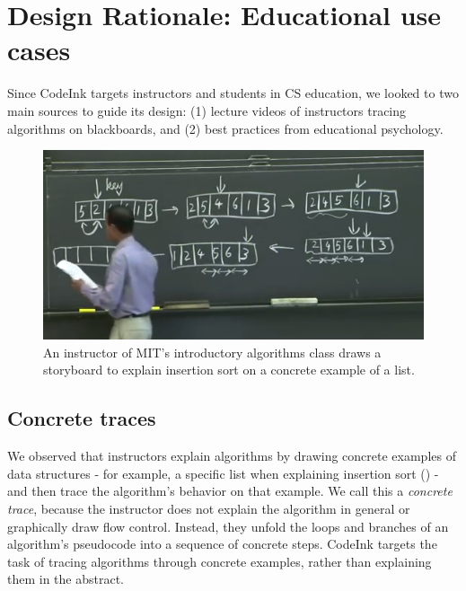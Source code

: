 \section{Design Rationale: Educational use cases}

Since CodeInk targets instructors and students in CS education, we looked to two
main sources to guide its design: (1) lecture videos of instructors tracing
algorithms on blackboards, and (2) best practices from educational psychology.

\begin{figure}
\begin{center}
\includegraphics[width=0.7\columnwidth]{img/6006/insertion.png}
\end{center}
\caption{An instructor of MIT's introductory algorithms class draws a storyboard
to explain insertion sort on a concrete example of a list.}
\label{fig:6006-insertion}
\end{figure}


\subsection{Concrete traces}
We observed that instructors explain algorithms by drawing concrete examples of
data structures - for example, a specific list when explaining insertion sort
() - and then trace the algorithm's behavior on that
example. We call this a \emph{concrete trace}, because the instructor does not
explain the algorithm in general or graphically draw flow control. Instead, they
unfold the loops and branches of an algorithm's pseudocode into a sequence of
concrete steps.
CodeInk targets the task of tracing algorithms through concrete examples, rather
than explaining them in the abstract.


